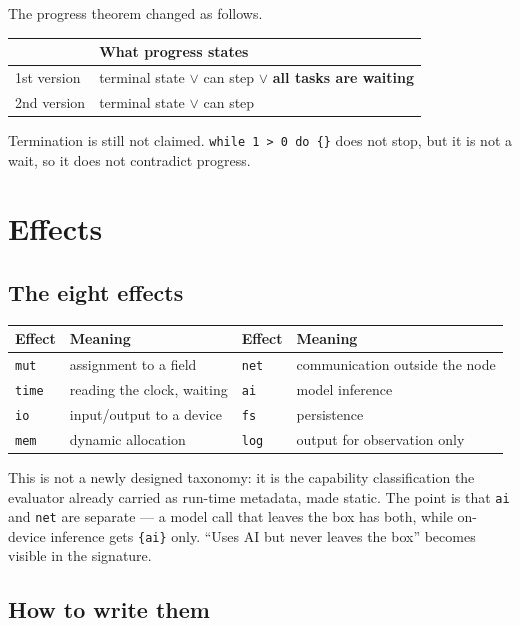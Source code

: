 \documentclass[11pt,a4paper]{article}
\newcommand{\eff}[1]{\texttt{\{#1\}}}
\begin{document}
The progress theorem changed as follows.

\begin{center}
\begin{tabular}{@{}ll@{}}
\toprule
& What progress states \\
\midrule
1st version & terminal state $\lor$ can step $\lor$ \textbf{all tasks are waiting} \\
2nd version & terminal state $\lor$ can step \\
\bottomrule
\end{tabular}
\end{center}

Termination is still not claimed. \texttt{while 1 > 0 do \{\}} does not stop,
but it is not a wait, so it does not contradict progress.

\section{Effects}
\label{sec:effects}

\subsection{The eight effects}

\begin{center}
\begin{tabular}{@{}llll@{}}
\toprule
Effect & Meaning & Effect & Meaning \\
\midrule
\texttt{mut}  & assignment to a field  & \texttt{net} & communication outside the node \\
\texttt{time} & reading the clock, waiting & \texttt{ai}  & model inference \\
\texttt{io}   & input/output to a device & \texttt{fs}  & persistence \\
\texttt{mem}  & dynamic allocation     & \texttt{log} & output for observation only \\
\bottomrule
\end{tabular}
\end{center}

This is not a newly designed taxonomy: it is the capability classification the
evaluator already carried as run-time metadata, made static. The point is that
\texttt{ai} and \texttt{net} are separate --- a model call that leaves the box
has both, while on-device inference gets \eff{ai} only. ``Uses AI but never
leaves the box'' becomes visible in the signature.

\subsection{How to write them}
\end{document}
